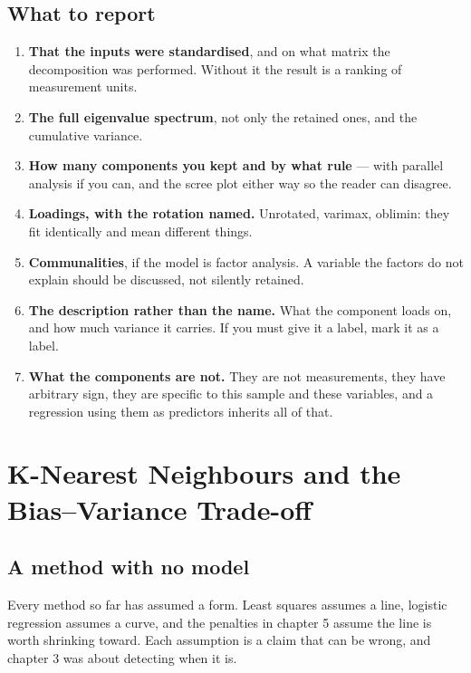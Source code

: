 \documentclass[
  letterpaper,
  10pt,
  twoside,
  openright,
  numbers=noenddot,
  chapterprefix=true]{scrbook}
\providecommand{\tightlist}{%
  \setlength{\itemsep}{0pt}\setlength{\parskip}{0pt}}
\begin{document}
\section{What to report}\label{what-to-report-5}

\begin{enumerate}
\def\labelenumi{\arabic{enumi}.}
\tightlist
\item
  \textbf{That the inputs were standardised}, and on what matrix the
  decomposition was performed. Without it the result is a ranking of
  measurement units.
\item
  \textbf{The full eigenvalue spectrum}, not only the retained ones, and
  the cumulative variance.
\item
  \textbf{How many components you kept and by what rule} --- with
  parallel analysis if you can, and the scree plot either way so the
  reader can disagree.
\item
  \textbf{Loadings, with the rotation named.} Unrotated, varimax,
  oblimin: they fit identically and mean different things.
\item
  \textbf{Communalities}, if the model is factor analysis. A variable
  the factors do not explain should be discussed, not silently retained.
\item
  \textbf{The description rather than the name.} What the component
  loads on, and how much variance it carries. If you must give it a
  label, mark it as a label.
\item
  \textbf{What the components are not.} They are not measurements, they
  have arbitrary sign, they are specific to this sample and these
  variables, and a regression using them as predictors inherits all of
  that.
\end{enumerate}


\chapter{K-Nearest Neighbours and the Bias--Variance
Trade-off}\label{k-nearest-neighbours-and-the-biasvariance-trade-off}

\section{A method with no model}\label{a-method-with-no-model}

Every method so far has assumed a form. Least squares assumes a line,
logistic regression assumes a curve, and the penalties in chapter 5
assume the line is worth shrinking toward. Each assumption is a claim
that can be wrong, and chapter 3 was about detecting when it is.
\end{document}
